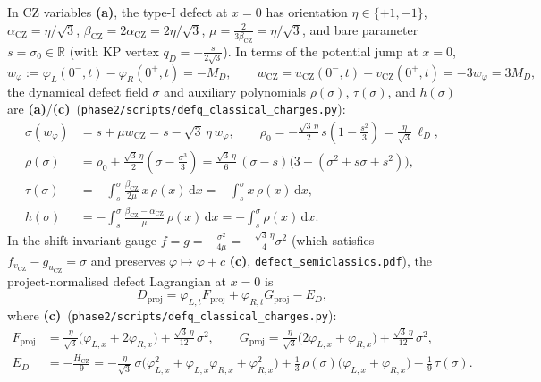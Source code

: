 \documentclass[11pt,a4paper]{article}
\newcommand{\La}{\textsf{\textbf{(a)}}}
\newcommand{\Lc}{\textsf{\textbf{(c)}}}
\newcommand{\dd}{\mathrm{d}}
\newcommand{\sclass}{\texttt{phase2/\allowbreak scripts/\allowbreak defq\_\allowbreak classical\_\allowbreak charges.py}}
\theoremstyle{remark}
\begin{document}
In CZ variables \cite{CZ} \La, the type-I defect at $x=0$ has orientation
$\eta \in \{+1,-1\}$, $\alpha_{\mathrm{CZ}} = \eta/\sqrt{3}$,
$\beta_{\mathrm{CZ}} = 2\alpha_{\mathrm{CZ}} = 2\eta/\sqrt{3}$,
$\mu = \frac{2}{3\beta_{\mathrm{CZ}}} = \eta/\sqrt{3}$, and bare parameter
$s = \sigma_0 \in \mathbb{R}$ (with KP vertex $q_D = -\frac{s}{2\sqrt{3}}$).
In terms of the potential jump at $x=0$,
\begin{equation}\label{eq:w_phi_def}
  w_\varphi := \varphi_L(0^-,t) - \varphi_R(0^+,t) = -M_D, \qquad
  w_{\mathrm{CZ}} = u_{\mathrm{CZ}}(0^-,t) - v_{\mathrm{CZ}}(0^+,t) = -3w_\varphi = 3M_D,
\end{equation}
the dynamical defect field $\sigma$ and auxiliary polynomials $\rho(\sigma)$,
$\tau(\sigma)$, and $h(\sigma)$ are \La/\Lc\ (\sclass):
\begin{align}
  \sigma(w_\varphi) &= s + \mu w_{\mathrm{CZ}} = s - \sqrt{3}\,\eta\,w_\varphi, \qquad
  \rho_0 = -\frac{\sqrt{3}\,\eta}{2}\,s\!\left(1 - \frac{s^2}{3}\right) = \frac{\eta}{\sqrt{3}}\,\ell_D, \label{eq:sigma_rho0}\\
  \rho(\sigma) &= \rho_0 + \frac{\sqrt{3}\,\eta}{2}\!\left(\sigma - \frac{\sigma^3}{3}\right)
  = \frac{\sqrt{3}\,\eta}{6}\,(\sigma - s)\big(3 - (\sigma^2 + s\sigma + s^2)\big), \label{eq:rho_def}\\
  \tau(\sigma) &= -\int_s^\sigma \frac{\beta_{\mathrm{CZ}}}{2\mu}\,x\,\rho(x)\,\dd x
  = -\int_s^\sigma x\,\rho(x)\,\dd x, \label{eq:tau_def}\\
  h(\sigma) &= -\int_s^\sigma \frac{\beta_{\mathrm{CZ}}-\alpha_{\mathrm{CZ}}}{\mu}\,\rho(x)\,\dd x
  = -\int_s^\sigma \rho(x)\,\dd x. \label{eq:h_def}
\end{align}
In the shift-invariant gauge $f = g = -\frac{\sigma^2}{4\mu} = -\frac{\sqrt{3}\,\eta}{4}\sigma^2$
(which satisfies $f_{v_{\mathrm{CZ}}} - g_{u_{\mathrm{CZ}}} = \sigma$ and preserves
$\varphi \mapsto \varphi + c$ \Lc, \texttt{defect\_semiclassics.pdf}), the
project-normalised defect Lagrangian at $x=0$ is
\begin{equation}\label{eq:D_proj}
  D_{\mathrm{proj}} = \varphi_{L,t} F_{\mathrm{proj}} + \varphi_{R,t} G_{\mathrm{proj}} - E_D,
\end{equation}
where \Lc\ (\sclass):
\begin{align}
  F_{\mathrm{proj}} &= \frac{\eta}{\sqrt{3}}\big(\varphi_{L,x} + 2\varphi_{R,x}\big) + \frac{\sqrt{3}\,\eta}{12}\,\sigma^2, \qquad
  G_{\mathrm{proj}} = \frac{\eta}{\sqrt{3}}\big(2\varphi_{L,x} + \varphi_{R,x}\big) + \frac{\sqrt{3}\,\eta}{12}\,\sigma^2, \label{eq:FG_proj}\\
  E_D &= -\frac{H_{\mathrm{CZ}}}{9}
  = -\frac{\eta}{\sqrt{3}}\,\sigma\big(\varphi_{L,x}^2 + \varphi_{L,x}\varphi_{R,x} + \varphi_{R,x}^2\big)
    + \frac{1}{3}\,\rho(\sigma)\big(\varphi_{L,x} + \varphi_{R,x}\big) - \frac{1}{9}\,\tau(\sigma). \label{eq:ED_proj}
\end{align}
\end{document}
